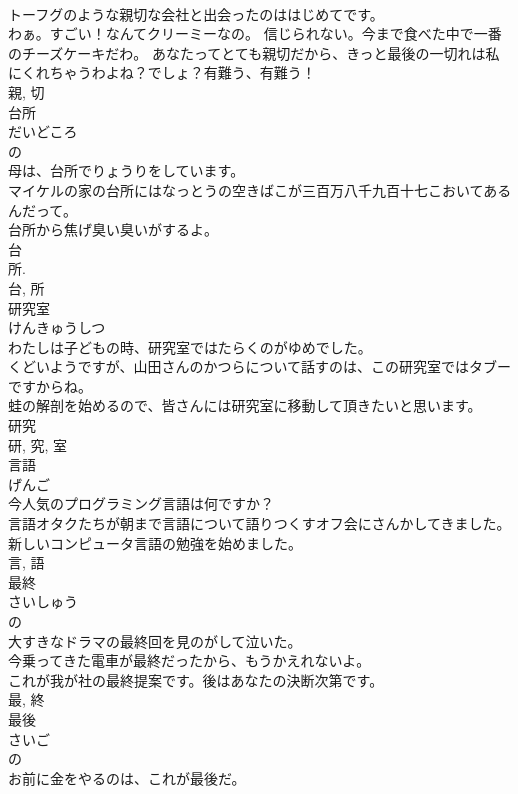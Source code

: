 \documentclass[8pt]{extreport}
\begin{document}
\begin{CJK}{UTF8}{min}
\\	トーフグのような親切な会社と出会ったのははじめてです。	
\\	わぁ。すごい！なんてクリーミーなの。 信じられない。今まで食べた中で一番のチーズケーキだわ。 あなたってとても親切だから、きっと最後の一切れは私にくれちゃうわよね？でしょ？有難う、有難う！	
\\	親, 切	
\\	台所	
\\	だいどころ	
\\	の 
\\	母は、台所でりょうりをしています。	
\\	マイケルの家の台所にはなっとうの空きばこが三百万八千九百十七こおいてあるんだって。	
\\	台所から焦げ臭い臭いがするよ。	
\\	台 
\\	所. 
\\	台, 所	
\\	研究室	
\\	けんきゅうしつ	
\\	わたしは子どもの時、研究室ではたらくのがゆめでした。	
\\	くどいようですが、山田さんのかつらについて話すのは、この研究室ではタブーですからね。	
\\	蛙の解剖を始めるので、皆さんには研究室に移動して頂きたいと思います。	
\\	研究 
\\	研, 究, 室	
\\	言語	
\\	げんご	
\\	今人気のプログラミング言語は何ですか？	
\\	言語オタクたちが朝まで言語について語りつくすオフ会にさんかしてきました。	
\\	新しいコンピュータ言語の勉強を始めました。	
\\	言, 語	
\\	最終	
\\	さいしゅう	
\\	の 
\\	大すきなドラマの最終回を見のがして泣いた。	
\\	今乗ってきた電車が最終だったから、もうかえれないよ。	
\\	これが我が社の最終提案です。後はあなたの決断次第です。	
\\	最, 終	
\\	最後	
\\	さいご	
\\	の 
\\	お前に金をやるのは、これが最後だ。	

\end{CJK}
\end{document}
